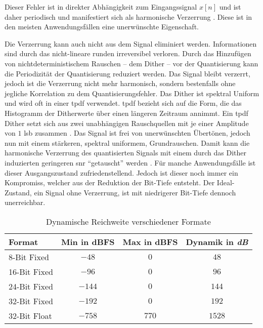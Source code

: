 Dieser Fehler ist in direkter Abhängigkeit zum Eingangssignal $x[n]$ und ist daher periodisch und manifestiert sich als harmonische Verzerrung \autocites{dither}{noise-shaping}.
Diese ist in den meisten Anwendungsfällen eine unerwünschte Eigenschaft.

Die Verzerrung kann auch nicht aus dem Signal eliminiert werden.
Informationen sind durch das nicht-lineare runden irreversibel verloren.
Durch das Hinzufügen von nichtdeterministischem Rauschen -- dem Dither -- vor der Quantisierung kann die Periodizität der Quantisierung reduziert werden.
Das Signal bleibt verzerrt, jedoch ist die Verzerrung nicht mehr harmonisch, sondern bestenfalls ohne jegliche Korrelation zu dem Quantisierungsfehler.
Das Dither ist spektral Uniform und wird oft in einer \gls{tpdf} verwendet.
\gls{tpdf} bezieht sich auf die Form, die das Histogramm der Ditherwerte über einen längeren Zeitraum annimmt.
Ein \gls{tpdf} Dither setzt sich aus zwei unabhängigen Rauschquellen mit je einer Amplitude von $1$ \gls{lsb} zusammen \autocites{dither}[S. 23ff, S. 30ff, Figure 2-10b]{dsp-guide}.
Das Signal ist frei von unerwünschten Übertönen, jedoch nun mit einem stärkeren, spektral uniformem, Grundrauschen.
Damit kann die harmonische Verzerrung des quantisierten Signals mit einem durch das Dither induzierten geringeren \gls{snr} \enquote{getauscht} werden \autocites{dither}{noise-shaping}.
Für manche Anwendungsfälle ist dieser Ausgangszustand zufriedenstellend.
Jedoch ist dieser noch immer ein Kompromiss, welcher aus der Reduktion der Bit-Tiefe entsteht.
Der Ideal-Zustand, ein Signal ohne Verzerrung, ist mit niedrigerer Bit-Tiefe dennoch unerreichbar.

\begin{table}[t]
    \centering
    \caption[Dynamische Reichweite verschiedener Formate]{Dynamische Reichweite verschiedener Formate}
    \vspace*{11pt}
    \begin{tabular}{lccc}
        \hline
        \textbf{Format} & \textbf{Min} in \gls{dBFS} & \textbf{Max} in \gls{dBFS} & \textbf{Dynamik} in \textit{dB} \\ \hline \hline
        8-Bit Fixed & $-48$ & $0$ & $48$ \\ \hline
        16-Bit Fixed & $-96$ & $0$ & $96$ \\ \hline
        24-Bit Fixed & $-144$ & $0$ & $144$ \\ \hline
        32-Bit Fixed & $-192$ & $0$ & $192$ \\ \hline
        32-Bit Float & $-758$ & $770$ & $1528$ \\ \hline
    \end{tabular}
    \label{tab:dynamic-range}
\end{table}

